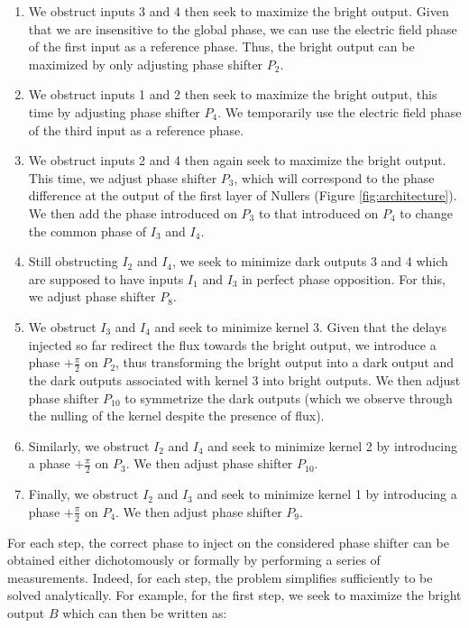 \documentclass{aa}
\begin{document}
            \begin{enumerate}
                \item We obstruct inputs 3 and 4 then seek to maximize the bright output. Given that we are insensitive to the global phase, we can use the electric field phase of the first input as a reference phase. Thus, the bright output can be maximized by only adjusting phase shifter $P_2$.
                \item We obstruct inputs 1 and 2 then seek to maximize the bright output, this time by adjusting phase shifter $P_4$. We temporarily use the electric field phase of the third input as a reference phase.
                \item We obstruct inputs 2 and 4 then again seek to maximize the bright output. This time, we adjust phase shifter $P_3$, which will correspond to the phase difference at the output of the first layer of Nullers (Figure \ref{fig:architecture}). We then add the phase introduced on $P_3$ to that introduced on $P_4$ to change the common phase of $I_3$ and $I_4$.
                \item Still obstructing $I_2$ and $I_4$, we seek to minimize dark outputs 3 and 4 which are supposed to have inputs $I_1$ and $I_3$ in perfect phase opposition. For this, we adjust phase shifter $P_8$.
                \item We obstruct $I_3$ and $I_4$ and seek to minimize kernel 3. Given that the delays injected so far redirect the flux towards the bright output, we introduce a phase $+\frac{\pi}{2}$ on $P_2$, thus transforming the bright output into a dark output and the dark outputs associated with kernel 3 into bright outputs. We then adjust phase shifter $P_10$ to symmetrize the dark outputs (which we observe through the nulling of the kernel despite the presence of flux).
                \item Similarly, we obstruct $I_2$ and $I_4$ and seek to minimize kernel 2 by introducing a phase $+\frac{\pi}{2}$ on $P_3$. We then adjust phase shifter $P_10$.
                \item Finally, we obstruct $I_2$ and $I_3$ and seek to minimize kernel 1 by introducing a phase $+\frac{\pi}{2}$ on $P_4$. We then adjust phase shifter $P_9$.
            \end{enumerate}

            For each step, the correct phase to inject on the considered phase shifter can be obtained either dichotomously or formally by performing a series of measurements. Indeed, for each step, the problem simplifies sufficiently to be solved analytically. For example, for the first step, we seek to maximize the bright output $B$ which can then be written as:
\end{document}
